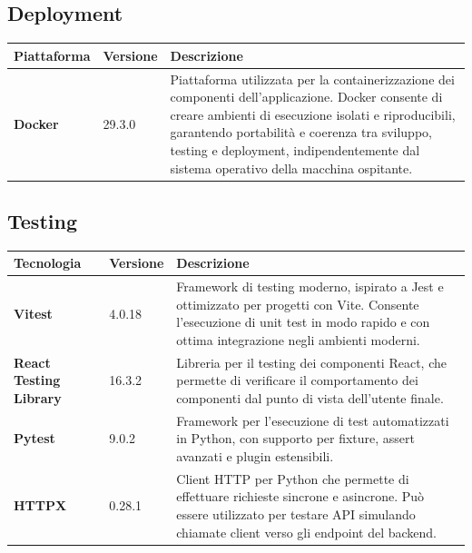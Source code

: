 \documentclass[a4paper,12pt]{article}
\begin{document}
        \subsection{Deployment}
        \begin{center}
            \begin{tabularx}{\textwidth}{|l|l|X|}
                \hline
                \rowcolor{gold}
                \textbf{Piattaforma} & \textbf{Versione} & \textbf{Descrizione}  \\
                \hline
                \textbf{Docker} & 29.3.0 & Piattaforma utilizzata per la containerizzazione dei componenti dell'applicazione. Docker consente di creare ambienti di esecuzione isolati e riproducibili, garantendo portabilità e coerenza tra sviluppo, testing e deployment, indipendentemente dal sistema operativo della macchina ospitante.\\
                \hline
            \end{tabularx}
        \end{center}

        \subsection{Testing}
        \begin{center}
            \begin{tabularx}{\textwidth}{|l|l|X|}
                \hline
                \rowcolor{gold}
                \textbf{Tecnologia} & \textbf{Versione} & \textbf{Descrizione}  \\
                \hline
                \textbf{Vitest} & 4.0.18 & Framework di testing moderno, ispirato a Jest e ottimizzato per progetti con Vite. Consente l'esecuzione di unit test in modo rapido e con ottima integrazione negli ambienti moderni. \\
                \hline
                \textbf{React Testing Library} & 16.3.2 & Libreria per il testing dei componenti React, che permette di verificare il comportamento dei componenti dal punto di vista dell'utente finale. \\
                \hline 
                \textbf{Pytest} & 9.0.2 & Framework per l'esecuzione di test automatizzati in Python, con supporto per fixture, assert avanzati e plugin estensibili. \\
                \hline 
                \textbf{HTTPX} & 0.28.1 & Client HTTP per Python che permette di effettuare richieste sincrone e asincrone. Può essere utilizzato per testare API simulando chiamate client verso gli endpoint del backend. \\
                \hline
            \end{tabularx}
        \end{center}
\end{document}
